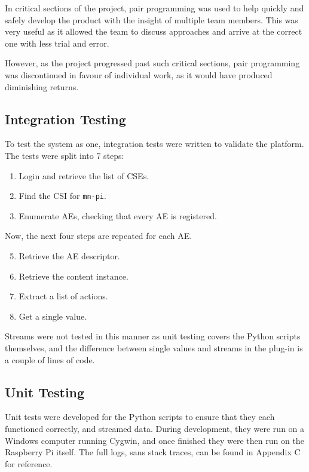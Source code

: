 In critical sections of the project, pair programming was used to help quickly and safely develop the product with the insight of multiple team members. This was very useful as it allowed the team to discuss approaches and arrive at the correct one with less trial and error.

However, as the project progressed past such critical sections, pair programming was discontinued in favour of individual work, as it would have produced diminishing returns.

\subsection{Integration Testing}

To test the system as one, integration tests were written to validate the platform. The tests were split into 7 steps:

\begin{enumerate}
\item Login and retrieve the list of CSEs.
\item Find the CSI for \lstinline{mn-pi}.
\item Enumerate AEs, checking that every AE is registered.
\end{enumerate}

Now, the next four steps are repeated for each AE.

\begin{enumerate}
\setcounter{enumi}{4}
\item Retrieve the AE descriptor.
\item Retrieve the content instance.
\item Extract a list of actions.
\item Get a single value.
\end{enumerate}

Streams were not tested in this manner as unit testing covers the Python scripts themselves, and the difference between single values and streams in the plug-in is a couple of lines of code. 

\subsection{Unit Testing}

Unit tests were developed for the Python scripts to ensure that they each functioned correctly, and streamed data. During development, they were run on a Windows computer running Cygwin, and once finished they were then run on the Raspberry Pi itself. The full logs, sans stack traces, can be found in Appendix C for reference.

